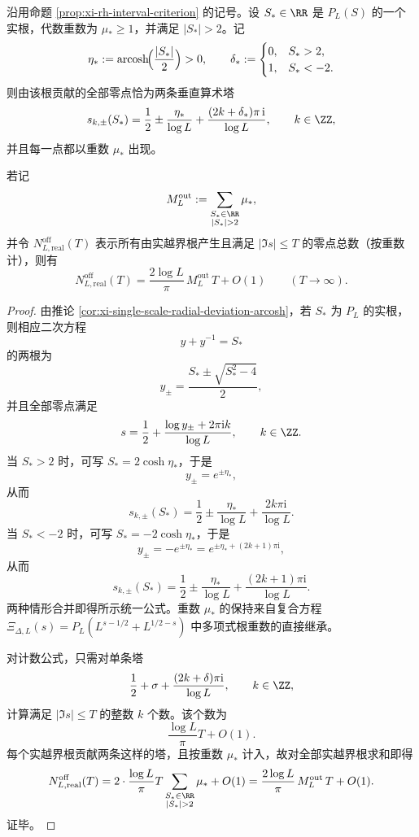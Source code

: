 \begin{theorem}\label{thm:xi-real-outlier-root-two-vertical-zero-towers-arcosh}
沿用命题 \ref{prop:xi-rh-interval-criterion} 的记号。设 \(S_\ast\in\RR\) 是 \(P_L(S)\) 的一个实根，代数重数为 \(\mu_\ast\ge 1\)，并满足 \(|S_\ast|>2\)。记
\[
\eta_\ast:=\operatorname{arcosh}\!\Bigl(\frac{|S_\ast|}{2}\Bigr)>0,
\qquad
\delta_\ast:=
\begin{cases}
0,& S_\ast>2,\\
1,& S_\ast<-2.
\end{cases}
\]
则由该根贡献的全部零点恰为两条垂直算术塔
\[
s_{k,\pm}(S_\ast)
=
\frac12\pm\frac{\eta_\ast}{\log L}
+\frac{(2k+\delta_\ast)\pi\,\mathrm{i}}{\log L},
\qquad k\in\ZZ,
\]
并且每一点都以重数 \(\mu_\ast\) 出现。

若记
\[
M_L^{\mathrm{out}}
:=
\sum_{\substack{S_\ast\in\RR\\ |S_\ast|>2}}\mu_\ast,
\]
并令 \(N^{\mathrm{off}}_{L,\mathrm{real}}(T)\) 表示所有由实越界根产生且满足 \(|\Im s|\le T\) 的零点总数（按重数计），则有
\[
N^{\mathrm{off}}_{L,\mathrm{real}}(T)
=
\frac{2\log L}{\pi}\,M_L^{\mathrm{out}}\,T+O(1)
\qquad(T\to\infty).
\]
\end{theorem}
\begin{proof}
由推论 \ref{cor:xi-single-scale-radial-deviation-arcosh}，若 \(S_\ast\) 为 \(P_L\) 的实根，则相应二次方程
\[
y+y^{-1}=S_\ast
\]
的两根为
\[
y_\pm=\frac{S_\ast\pm\sqrt{S_\ast^2-4}}{2},
\]
并且全部零点满足
\[
s=\frac12+\frac{\log y_\pm+2\pi\mathrm{i}k}{\log L},
\qquad k\in\ZZ.
\]
当 \(S_\ast>2\) 时，可写 \(S_\ast=2\cosh\eta_\ast\)，于是
\[
y_\pm=e^{\pm\eta_\ast},
\]
从而
\[
s_{k,\pm}(S_\ast)=\frac12\pm\frac{\eta_\ast}{\log L}+\frac{2k\pi\mathrm{i}}{\log L}.
\]
当 \(S_\ast<-2\) 时，可写 \(S_\ast=-2\cosh\eta_\ast\)，于是
\[
y_\pm=-e^{\pm\eta_\ast}=e^{\pm\eta_\ast+(2k+1)\pi\mathrm{i}},
\]
从而
\[
s_{k,\pm}(S_\ast)=\frac12\pm\frac{\eta_\ast}{\log L}+\frac{(2k+1)\pi\mathrm{i}}{\log L}.
\]
两种情形合并即得所示统一公式。重数 \(\mu_\ast\) 的保持来自复合方程 \(\Xi_{\Delta,L}(s)=P_L(L^{s-1/2}+L^{1/2-s})\) 中多项式根重数的直接继承。

对计数公式，只需对单条塔
\[
\frac12+\sigma+\frac{(2k+\delta)\pi\mathrm{i}}{\log L},
\qquad k\in\ZZ,
\]
计算满足 \(|\Im s|\le T\) 的整数 \(k\) 个数。该个数为
\[
\frac{\log L}{\pi}T+O(1).
\]
每个实越界根贡献两条这样的塔，且按重数 \(\mu_\ast\) 计入，故对全部实越界根求和即得
\[
N^{\mathrm{off}}_{L,\mathrm{real}}(T)
=
2\cdot\frac{\log L}{\pi}T
\sum_{\substack{S_\ast\in\RR\\ |S_\ast|>2}}\mu_\ast+O(1)
=
\frac{2\log L}{\pi}\,M_L^{\mathrm{out}}\,T+O(1).
\]
证毕。
\end{proof}

